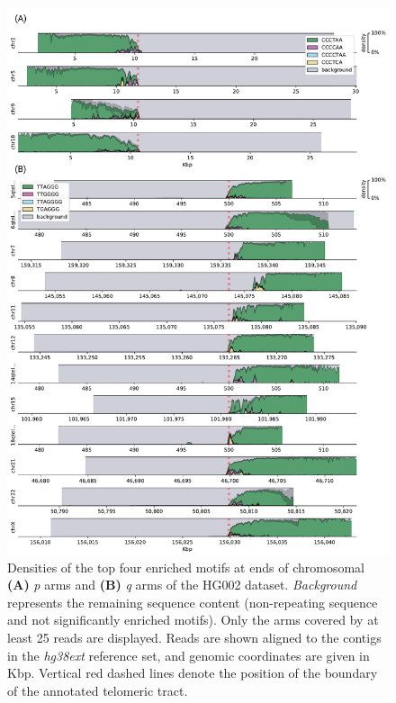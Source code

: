 \documentclass{article}
\begin{document}
        \begin{figure}[h!] \centering
        \includegraphics[height=.88\textheight,width=\textwidth,keepaspectratio]{renders/figures/Figure-2.pdf}
        \caption{
             \small Densities of the top four enriched motifs at ends of chromosomal \textbf{(A)} \textit{p} arms
             and \textbf{(B)} \textit{q} arms of the HG002 dataset.
             \textit{Background} represents the remaining sequence content (non-repeating sequence and not significantly enriched motifs).
             Only the arms covered by at least 25 reads are displayed.
             Reads are shown aligned to the contigs in the \textit{hg38ext} reference set, and genomic coordinates are given in Kbp.
             Vertical red dashed lines denote the position of the boundary of the annotated telomeric tract.
        }
        \label{fig:hg002_densityplot}
        \end{figure}
\end{document}
